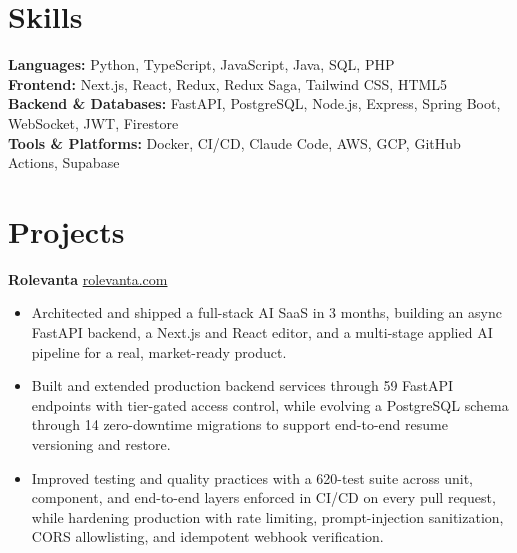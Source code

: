 \documentclass[11pt]{article}       %
\begin{document}
\vspace{-10.5pt}

\section*{Skills}
\textbf{Languages:} Python, TypeScript, JavaScript, Java, SQL, PHP \\
\textbf{Frontend:} Next.js, React, Redux, Redux Saga, Tailwind CSS, HTML5 \\
\textbf{Backend \& Databases:} FastAPI, PostgreSQL, Node.js, Express, Spring Boot, WebSocket, JWT, Firestore \\
\textbf{Tools \& Platforms:} Docker, CI/CD, Claude Code, AWS, GCP, GitHub Actions, Supabase
\vspace{-5pt}






\section*{Projects}
\textbf{Rolevanta} \hfill \href{https://rolevanta.com}{rolevanta.com} \\
\vspace{-9pt}
\begin{itemize}
  \item Architected and shipped a full-stack AI SaaS in 3 months, building an async FastAPI backend, a Next.js and React editor, and a multi-stage applied AI pipeline for a real, market-ready product.
  \item Built and extended production backend services through 59 FastAPI endpoints with tier-gated access control, while evolving a PostgreSQL schema through 14 zero-downtime migrations to support end-to-end resume versioning and restore.
  \item Improved testing and quality practices with a 620-test suite across unit, component, and end-to-end layers enforced in CI/CD on every pull request, while hardening production with rate limiting, prompt-injection sanitization, CORS allowlisting, and idempotent webhook verification.
\end{itemize}
\end{document}
